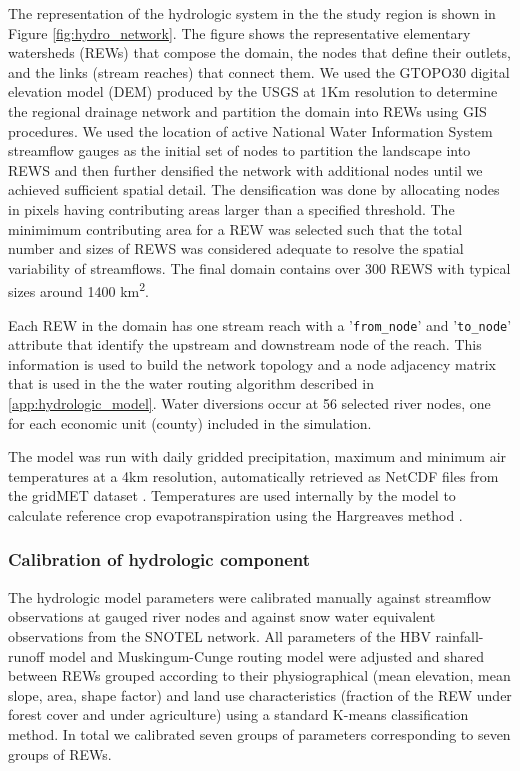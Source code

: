 The representation of the hydrologic system in the the study region is shown in Figure \ref{fig:hydro_network}. The figure shows the representative elementary watersheds (REWs) that compose the domain, the nodes that define their outlets, and the links (stream reaches) that connect them. We used the GTOPO30 digital elevation model (DEM) produced by the USGS at 1Km resolution to determine the regional drainage network and partition the domain into REWs using GIS procedures. We used the location of active National Water Information System streamflow gauges as the initial set of nodes to partition the landscape into REWS and then further densified the network with additional nodes until we achieved sufficient spatial detail. The densification was done by allocating nodes in pixels having contributing areas larger than a specified threshold. The minimimum contributing area for a REW was selected such that the total number and sizes of REWS was considered adequate to resolve the spatial variability of streamflows. The final domain contains over 300 REWS with typical sizes around 1400 \si{\kilo\meter\squared}. 

Each REW in the domain has one stream reach with a '\texttt{from\_node}' and '\texttt{to\_node}' attribute that identify the upstream and downstream node of the reach. This information is used to build the network topology and a node adjacency matrix that is used in the the water routing algorithm described in \ref{app:hydrologic_model}. Water diversions occur at 56 selected river nodes, one for each economic unit (county) included in the simulation.  

The model was run with daily gridded precipitation, maximum and minimum air temperatures at a 4\si{\kilo\meter} resolution, automatically retrieved as NetCDF files from the gridMET dataset \citep{Abatzoglou2013}. Temperatures are used internally by the model to calculate reference crop evapotranspiration using the Hargreaves method \citep{Hargreaves1985}.

\subsubsection{Calibration of hydrologic component}

The hydrologic model parameters were calibrated manually against streamflow observations at gauged river nodes and against snow water equivalent observations from the SNOTEL network. All parameters of the HBV rainfall-runoff model and Muskingum-Cunge routing model were adjusted and shared between REWs grouped according to their physiographical (mean elevation, mean slope, area, shape factor) and land use characteristics (fraction of the REW under forest cover and under agriculture) using a standard K-means classification method. In total we calibrated seven groups of parameters corresponding to seven groups of REWs.   

